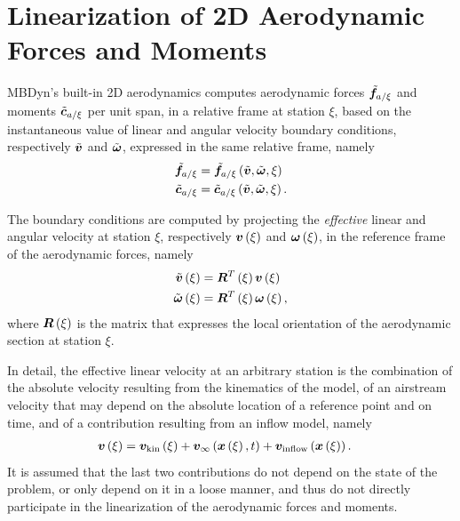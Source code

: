 \section{Linearization of 2D Aerodynamic Forces and Moments}
MBDyn's built-in 2D aerodynamics computes
aerodynamic forces $\tilde{\bm{f}}_{a/\xi}$
and moments $\tilde{\bm{c}}_{a/\xi}$ per unit span,
in a relative frame at station $\xi$,
based on the instantaneous value of linear and angular velocity
boundary conditions, respectively $\tilde{\bm{v}}$ and $\tilde{\bm{\omega}}$,
expressed in the same relative frame, namely
\begin{subequations}
\begin{align}
	\tilde{\bm{f}}_{a/\xi}
	&=
	\tilde{\bm{f}}_{a/\xi}\left( \tilde{\bm{v}}, \tilde{\bm{\omega}}, \xi \right)
	\\
	\tilde{\bm{c}}_{a/\xi}
	&=
	\tilde{\bm{c}}_{a/\xi}\left( \tilde{\bm{v}}, \tilde{\bm{\omega}}, \xi \right)
	.
\end{align}
\end{subequations}

The boundary conditions are computed by projecting the \emph{effective}
linear and angular velocity at station $\xi$,
respectively $\bm{v}\left( \xi \right)$ and $\bm{\omega}\left( \xi \right)$,
in the reference frame of the aerodynamic forces,
namely
\begin{subequations}
\begin{align}
	\tilde{\bm{v}}\left( \xi \right)
	&=
	\bm{R}^T\left( \xi \right) \bm{v}\left( \xi \right)
	\\
	\tilde{\bm{\omega}}\left( \xi \right)
	&=
	\bm{R}^T\left( \xi \right) \bm{\omega}\left( \xi \right)
	,
\end{align}
\end{subequations}
where $\bm{R}\left( \xi \right)$ is the matrix that expresses
the local orientation of the aerodynamic section at station $\xi$.

In detail, the effective linear velocity at an arbitrary station
is the combination of the absolute velocity resulting from the kinematics
of the model, of an airstream velocity that may depend
on the absolute location of a reference point and on time,
and of a contribution resulting from an inflow model, namely
\begin{align}
	\bm{v}\left( \xi \right)
	&=
	\bm{v}_{\text{kin}}\left( \xi \right)
	+ \bm{v}_{\infty}\left( \bm{x}\left( \xi \right), t \right)
	+ \bm{v}_{\text{inflow}}\left( \bm{x}\left( \xi \right) \right)
	.
\end{align}
It is assumed that the last two contributions do not depend
on the state of the problem, or only depend on it in a loose manner,
and thus do not directly participate in the linearization
of the aerodynamic forces and moments.

